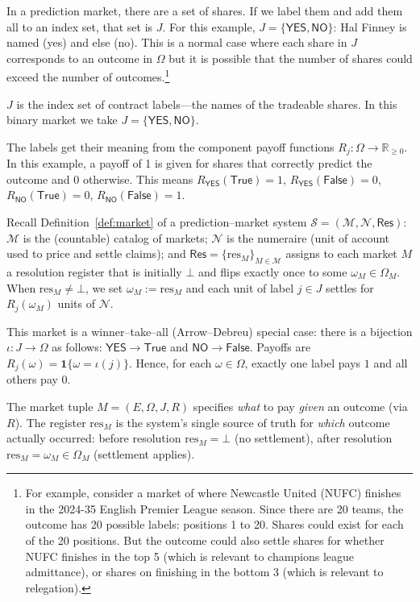 In a prediction market, there are a set of shares. If we label them and add them all to an index set, that set is $J$. For this example, $J=\{\textsf{YES},\textsf{NO}\}$: Hal Finney is named (yes) and else (no). This is a normal case where each share in $J$ corresponds to an outcome in $\Omega$ but it is possible that the number of shares could exceed the number of outcomes.\footnote{For example, consider a market of where Newcastle United (NUFC) finishes in the 2024-35 English Premier League season. Since there are 20 teams, the outcome has 20 possible labels: positions 1 to 20. Shares could exist for each of the 20 positions. But the outcome could also settle shares for whether NUFC finishes in the top 5 (which is relevant to champions league admittance), or shares on finishing in the bottom 3 (which is relevant to relegation).}

$J$ is the index set of contract labels—the names of the tradeable shares. In this binary market we take $J=\{\textsf{YES},\textsf{NO}\}$. 

The labels get their meaning from the component payoff functions $R_j:\Omega\to\mathbb{R}_{\ge 0}$. In this example, a payoff of 1 is given for shares that correctly predict the outcome and 0 otherwise. This means $R_{\textsf{YES}}(\mathsf{True})=1$, $R_{\textsf{YES}}(\mathsf{False})=0$, $R_{\textsf{NO}}(\mathsf{True})=0$, $R_{\textsf{NO}}(\mathsf{False})=1$.

Recall Definition~\ref{def:market} of a prediction--market system $\mathcal{S}=(\mathcal{M},\mathcal{N},\mathsf{Res})$:
$\mathcal{M}$ is the (countable) catalog of markets; $\mathcal{N}$ is the numeraire (unit of account used to price and settle claims);
and $\mathsf{Res}=\{\mathrm{res}_M\}_{M\in\mathcal{M}}$ assigns to each market $M$ a resolution register that is initially
$\bot$ and flips exactly once to some $\omega_M\in\Omega_M$.
When $\mathrm{res}_M\neq\bot$, we set $\omega_M:=\mathrm{res}_M$ and each unit of label $j\in J$ settles for $R_j(\omega_M)$ units of $\mathcal{N}$.

This market is a winner--take--all (Arrow--Debreu) special case: there is a bijection $\iota:J\to\Omega$ as follows: $\textsf{YES}\rightarrow\mathsf{True}$ and $\textsf{NO}\rightarrow\mathsf{False}$. Payoffs are $R_j(\omega)=\mathbf{1}\{\omega=\iota(j)\}$. Hence, for each $\omega\in\Omega$, exactly one label pays $1$ and all others pay $0$. 

The market tuple $M=(E,\Omega,J,R)$ specifies \emph{what} to pay \emph{given} an outcome (via $R$).
The register $\mathrm{res}_M$ is the system’s single source of truth for \emph{which} outcome actually occurred:
before resolution $\mathrm{res}_M=\bot$ (no settlement), after resolution $\mathrm{res}_M=\omega_M\in\Omega_M$ (settlement applies).


